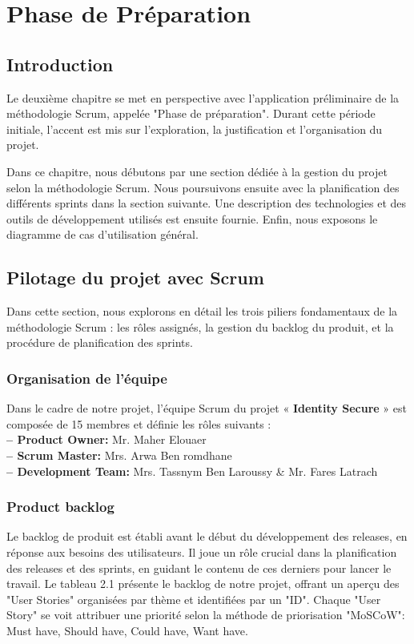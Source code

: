 \chapter{Phase de Préparation}
\section*{Introduction}
Le deuxième chapitre se met en perspective avec l'application préliminaire de la méthodologie Scrum, appelée "Phase de préparation". Durant cette période initiale, l'accent est mis sur l'exploration, la justification et l'organisation du projet.

Dans ce chapitre, nous débutons par une section dédiée à la gestion du projet selon la méthodologie Scrum. Nous poursuivons ensuite avec la planification des différents sprints dans la section suivante. Une description des technologies et des outils de développement utilisés est ensuite fournie. Enfin, nous exposons le diagramme de cas d'utilisation général.

\section*{Pilotage du projet avec Scrum}
Dans cette section, nous explorons en détail les trois piliers fondamentaux de la méthodologie Scrum : les rôles assignés, la gestion du backlog du produit, et la procédure de planification des sprints.
\subsection{Organisation de l'équipe}
Dans le cadre de notre projet, l'équipe Scrum du projet « \textbf{Identity Secure} » est composée de
15 membres et définie les rôles suivants :\\
\textbf{– Product Owner:} Mr. Maher Elouaer\\
\textbf{– Scrum Master:} Mrs. Arwa Ben romdhane\\
\textbf{– Development Team:} Mrs. Tassnym Ben Laroussy \& Mr. Fares Latrach\\
\subsection{Product backlog}
Le backlog de produit est établi avant le début du développement des releases, en réponse aux besoins des utilisateurs. Il joue un rôle crucial dans la planification des releases et des sprints, en guidant le contenu de ces derniers pour lancer le travail. Le tableau 2.1 présente le backlog de notre projet, offrant un aperçu des "User Stories" organisées par thème et identifiées par un "ID". Chaque "User Story" se voit attribuer une priorité selon la méthode de priorisation "MoSCoW": Must have, Should have, Could have, Want have.

